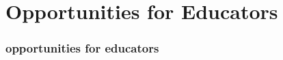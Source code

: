 \section{Opportunities for Educators}
\begin{comment}
* What can you do?
**  Who's there to help you?
** Who's working on this?
\end{comment}

\begin{frame} 
\frametitle{opportunities for educators}
\end{frame} 
